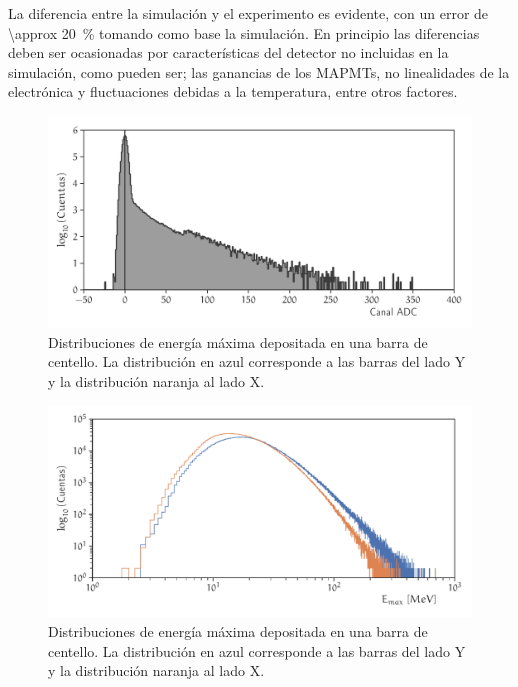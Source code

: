 La diferencia entre la simulación y el experimento es evidente, con un error de \SI{\approx 20}{\percent} tomando como base la simulación. En principio las diferencias deben ser ocasionadas por características del detector no incluidas en la simulación, como pueden ser; las ganancias de los MAPMTs, no linealidades de la electrónica y fluctuaciones debidas a la temperatura, entre otros factores.


\begin{figure}
        \centering
        \includegraphics[width=\textwidth]{neutron-ped.pdf}
        \caption{Distribuciones de energía máxima depositada en una barra de centello. La distribución en azul corresponde a las barras del lado Y y la distribución naranja al lado X.}
        \label{fig:neutron-pedestal}
\end{figure}


\begin{figure}
        \centering
        \includegraphics[width=\textwidth]{neutron-mindep.pdf}
        \caption{Distribuciones de energía máxima depositada en una barra de centello. La distribución en azul corresponde a las barras del lado Y y la distribución naranja al lado X.}
        \label{fig:neutron-mindep}
\end{figure}




